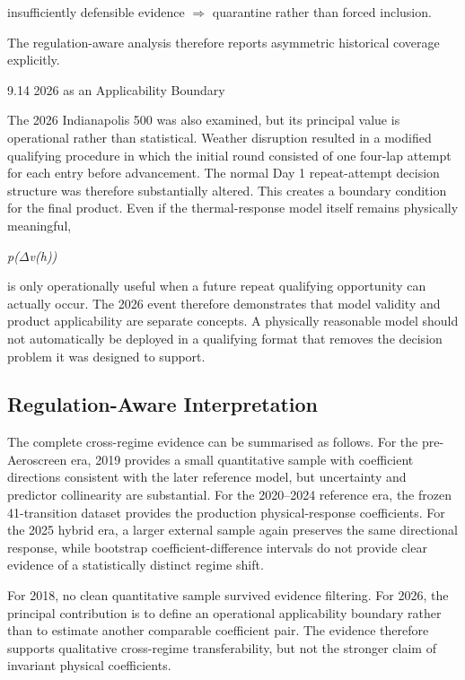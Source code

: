 insufficiently defensible evidence \ensuremath{\Rightarrow} quarantine rather than forced inclusion.

The regulation-aware analysis therefore reports asymmetric historical coverage explicitly.

9.14 2026 as an Applicability Boundary

The 2026 Indianapolis 500 was also examined, but its principal value is operational rather than statistical. Weather disruption resulted in a modified qualifying procedure in which the initial round consisted of one four-lap attempt for each entry before advancement. The normal Day 1 repeat-attempt decision structure was therefore substantially altered. This creates a boundary condition for the final product. Even if the thermal-response model itself remains physically meaningful,

\begin{center}\textit{p(\ensuremath{\Delta}v(h))}\end{center}

is only operationally useful when a future repeat qualifying opportunity can actually occur. The 2026 event therefore demonstrates that model validity and product applicability are separate concepts. A physically reasonable model should not automatically be deployed in a qualifying format that removes the decision problem it was designed to support.

\subsection{Regulation-Aware Interpretation}
The complete cross-regime evidence can be summarised as follows. For the pre-Aeroscreen era, 2019 provides a small quantitative sample with coefficient directions consistent with the later reference model, but uncertainty and predictor collinearity are substantial. For the 2020--2024 reference era, the frozen 41-transition dataset provides the production physical-response coefficients. For the 2025 hybrid era, a larger external sample again preserves the same directional response, while bootstrap coefficient-difference intervals do not provide clear evidence of a statistically distinct regime shift.

For 2018, no clean quantitative sample survived evidence filtering. For 2026, the principal contribution is to define an operational applicability boundary rather than to estimate another comparable coefficient pair. The evidence therefore supports qualitative cross-regime transferability, but not the stronger claim of invariant physical coefficients.

